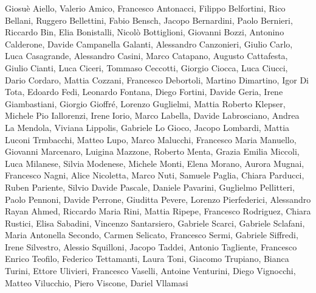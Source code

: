 Giosuè Aiello,
Valerio Amico,
Francesco Antonacci,
Filippo Belfortini,
Rico Bellani,
Ruggero Bellettini,
Fabio Bensch,
Jacopo Bernardini,
Paolo Bernieri,
Riccardo Bin,
Elia Bonistalli,
Nicolò Bottiglioni,
Giovanni Bozzi,
Antonino Calderone,
Davide Campanella Galanti,
Alessandro Canzonieri,
Giulio Carlo,
Luca Casagrande,
Alessandro Casini,
Marco Catapano,
Augusto Cattafesta,
Giulio Cianti,
Luca Ciceri,
Tommaso Ceccotti,
Giorgio Ciocca,
Luca Ciucci,
Dario Cordaro,
Mattia Cozzani,
Francesco Debortoli,
Martino Dimartino,
Igor Di Tota,
Edoardo Fedi,
Leonardo Fontana,
Diego Fortini,
Davide Geria,
Irene Giambastiani,
Giorgio Gioffré,
Lorenzo Guglielmi,
Mattia Roberto Klepser,
Michele Pio Iallorenzi,
Irene Iorio,
Marco Labella,
Davide Labrosciano,
Andrea La Mendola,
Viviana Lippolis,
Gabriele Lo Gioco,
Jacopo Lombardi,
Mattia Luconi Trmbacchi,
Matteo Lupo,
Marco Malucchi,
Francesco Maria Manuello,
Giovanni Marcenaro,
Luigina Mazzone,
Roberto Menta,
Grazia Emilia Miccoli,
Luca Milanese,
Silvia Modenese,
Michele Monti,
Elena Morano,
Aurora Mugnai,
Francesco Nagni,
Alice Nicoletta,
Marco Nuti,
Samuele Paglia,
Chiara Parducci,
Ruben Pariente,
Silvio Davide Pascale,
Daniele Pavarini,
Guglielmo Pellitteri,
Paolo Pennoni,
Davide Perrone,
Giuditta Pevere,
Lorenzo Pierfederici,
Alessandro Rayan Ahmed,
Riccardo Maria Rini,
Mattia Ripepe,
Francesco Rodriguez,
Chiara Rustici,
Elisa Sabadini,
Vincenzo Santarsiero,
Gabriele Scarci,
Gabriele Sclafani,
Maria Antonella Secondo,
Carmen Selicato,
Francesco Sermi,
Gabriele Siffredi,
Irene Silvestro,
Alessio Squilloni,
Jacopo Taddei,
Antonio Tagliente,
Francesco Enrico Teofilo,
Federico Tettamanti,
Laura Toni,
Giacomo Trupiano,
Bianca Turini,
Ettore Ulivieri,
Francesco Vaselli,
Antoine Venturini,
Diego Vignocchi,
Matteo Vilucchio,
Piero Viscone,
Dariel Vllamasi